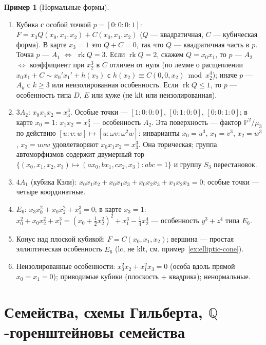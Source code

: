 \documentclass[11pt,a4paper]{article}
\theoremstyle{plain}
\theoremstyle{definition}
\newtheorem{example}[theorem]{Пример}
\theoremstyle{remark}
\newcommand{\Q}{\mathbb{Q}}
\newcommand{\PP}{\mathbb{P}}
\DeclareMathOperator{\rk}{rk}
\begin{document}
\begin{example}[Нормальные формы]\label{ex:cubic-normal-forms}
\begin{enumerate}
\item Кубика с особой точкой $p=[0:0:0:1]$: $F=x_3Q(x_0,x_1,x_2)+C(x_0,x_1,x_2)$ ($Q$ ---
квадратичная, $C$ --- кубическая форма). В карте $x_3=1$ это $Q+C=0$, так что $Q$ --- квадратичная
часть в $p$. Точка $p$ --- $A_1$ $\iff$ $\rk Q=3$. Если $\rk Q=2$, скажем $Q=x_0x_1$, то $p$ ---
$A_2$ $\iff$ коэффициент при $x_2^3$ в $C$ отличен от нуля (по лемме о расщеплении
$x_0x_1+C\sim x_0'x_1'+h(x_2)$ с $h(x_2)\equiv C(0,0,x_2)\bmod x_2^4$); иначе $p$ --- $A_k$ с
$k\ge3$ или неизолированная особенность. Если $\rk Q\le1$, то $p$ --- особенность типа $D$, $E$
или хуже (не klt или неизолированная).
\item $3A_2$: $x_0x_1x_2=x_3^3$. Особые точки --- $[1:0:0:0]$, $[0:1:0:0]$, $[0:0:1:0]$; в карте
$x_0=1$: $x_1x_2=x_3^3$ --- особенность $A_2$. Эта поверхность --- фактор $\PP^2/\mu_3$ по действию
$[u:v:w]\mapsto[u:\omega v:\omega^2w]$: инварианты $x_0=u^3$, $x_1=v^3$, $x_2=w^3$, $x_3=uvw$
удовлетворяют $x_0x_1x_2=x_3^3$. Она торическая; группа автоморфизмов содержит двумерный тор
$\{(x_0,x_1,x_2,x_3)\mapsto(ax_0,bx_1,cx_2,x_3): abc=1\}$ и группу $S_3$ перестановок.
\item $4A_1$ (кубика Кэли): $x_0x_1x_2+x_0x_1x_3+x_0x_2x_3+x_1x_2x_3=0$; особые точки --- четыре
координатные.
\item $E_6$: $x_3x_0^2+x_0x_2^2+x_1^3=0$; в карте $x_3=1$: $x_0^2+x_0x_2^2+x_1^3=
(x_0+\tfrac12x_2^2)^2+x_1^3-\tfrac14x_2^4$ --- особенность $y^3+z^4$ типа $E_6$.
\item Конус над плоской кубикой: $F=C(x_0,x_1,x_2)$; вершина --- простая эллиптическая особенность
$\tilde E_6$ (lc, не klt, см. пример~\ref{ex:elliptic-cone}).
\item Неизолированные особенности: $x_0^2x_2+x_1^2x_3=0$ (особа вдоль прямой $x_0=x_1=0$);
приводимые кубики (плоскость + квадрика); ненормальные.
\end{enumerate}
\end{example}

\section{Семейства, схемы Гильберта, $\Q$-горенштейновы семейства}\label{sec:families}
\end{document}
